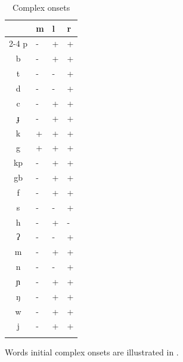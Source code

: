 \documentclass[output=paper]{langscibook}
\begin{document}
 
\begin{table}[]
    \centering
    \caption{Complex onsets \label{tab:traore:complexOnsets:4}}
\begin{tabularx}{.6\textwidth}{c|XXX}
\lsptoprule
{} & m  & l & r \\
\cline{2-4}
p & {}- & + & +\\
b & {}- & + & +\\
t & {}- & {}- & +\\
d & {}- & {}- & +\\
c & {}- & + & +\\
ɟ & {}- & + & +\\
k & + & + & +\\
g & + & + & +\\
kp & {}- & + & +\\
gb & {}- & + & +\\
f & {}- & + & +\\
s & {}- & {}- & +\\
h & {}- & + & {}-\\
ʔ & {}- & {}- & +\\
m & {}- & + & +\\
n & {}- & {}- & +\\
ɲ & {}- & + & +\\
ŋ & {}- & + & +\\
w & {}- & + & +\\
j & {}- & + & +\\
\lspbottomrule
\end{tabularx}
\end{table}

Words initial complex onsets are illustrated in . 
\end{document}
